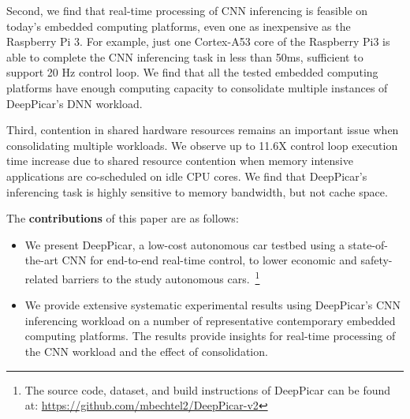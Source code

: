 Second, we find that real-time processing of CNN inferencing is
feasible on today's embedded computing platforms, even one   
as inexpensive as the Raspberry Pi 3. For example, just one Cortex-A53
core of the Raspberry Pi3 is able to complete the CNN inferencing task
in less than 50ms, sufficient to support 20 Hz control loop. 
We find that all the tested embedded computing platforms have 
enough computing capacity to consolidate multiple instances of
DeepPicar's DNN workload.

Third, contention in shared hardware resources remains an important
issue when consolidating multiple workloads. 
We observe up to 11.6X control
loop execution time increase due to shared resource contention when
memory intensive  applications are co-scheduled on idle CPU cores.
We find that DeepPicar's inferencing task is highly
sensitive to memory bandwidth, but not cache space.


The {\bf contributions} of this paper are as follows:
\begin{itemize}
  \item We present DeepPicar, a low-cost autonomous car testbed using
    a state-of-the-art CNN for end-to-end real-time control, to lower
    economic and safety-related barriers to the study autonomous
    cars.~\footnote{The source code, dataset, and build instructions
      of DeepPicar can be found at: \url{https://github.com/mbechtel2/DeepPicar-v2}}
    
  \item We provide extensive systematic experimental results using
    DeepPicar's CNN inferencing workload on a number of representative
    contemporary embedded computing platforms. The results provide
    insights for real-time processing of the CNN workload and the
    effect of consolidation.
    
\end{itemize}

